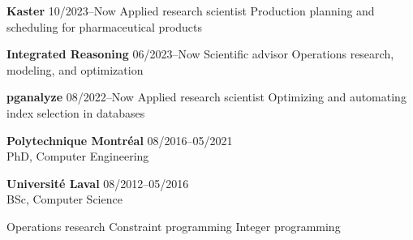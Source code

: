 \documentclass{memoir}
\begin{document}
\par
\vspace{1.5\baselineskip}
\begin{list}{}{
    \setlength\leftmargin{1.2in}
    \setlength\rightmargin{0in}
    \setlength{}
    \setlength{}
    \setlength\listparindent{0in}
    \setlength\itemindent{0in}
    \setlength\parskip{0in}
    \setlength\topsep{0in}
    \setlength\parsep{0in}
    \setlength\itemsep{0.90\baselineskip}
    \setlength\partopsep{0in}}

  


  \Item \textbf{Kaster} \hfill 10/2023--Now
  \BulletItem Applied research scientist
  \BulletItem Production planning and scheduling for pharmaceutical products
  
  \Item \textbf{Integrated Reasoning} \hfill 06/2023--Now
  \BulletItem Scientific advisor
  \BulletItem Operations research, modeling, and optimization
  
  \Item \textbf{pganalyze} \hfill 08/2022--Now
  \BulletItem Applied research scientist
  \BulletItem Optimizing and automating index selection in databases




  

  \Item \textbf{Polytechnique Montréal} \hfill 08/2016--05/2021 \\
  PhD, Computer Engineering

  \Item \textbf{Université Laval} \hfill 08/2012--05/2016 \\
  BSc, Computer Science

  

  
  \BulletItem Operations research
  \BulletItem Constraint programming
  \BulletItem Integer programming


\end{list}
\end{document}
